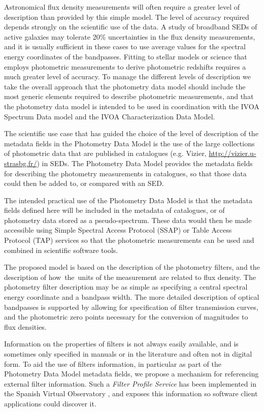 \documentclass[11pt,a4paper]{ivoa}
\begin{document}
Astronomical flux density measurements will often require a
greater level of description than provided by this simple model.
The level of accuracy required depends strongly on the scientific
use of the data. A study of broadband SEDs of active galaxies may
tolerate 20$\%$  uncertainties in the flux density measurements,
and it is usually sufficient in these cases to use average values
for the spectral energy coordinates of the bandpasses. Fitting to
stellar models or science that employs photometric measurements to
derive photometric redshifts requires a much greater level of accuracy.
To manage the different levels of description we take the overall
approach that the photometry data model should include the most
generic elements required to describe photometric measurements,
and that the photometry data model is intended to be used in
coordination with the IVOA Spectrum Data model and the IVOA
Characterization Data Model.

The scientific use case that has guided the choice of the level
of description of the metadata fields in the Photometry Data Model
is the use of the large collections of photometric data that are
published in catalogues (e.g. Vizier, \url{http://vizier.u-strasbg.fr/})
in SEDs. The Photometry Data Model provides the metadata fields for
describing the photometry measurements in catalogues, so that those
data could then be added to, or compared with an SED.

The intended practical use of the Photometry Data Model is that the
metadata fields defined here will be included in the metadata of
catalogues, or of photometry data stored as a pseudo-spectrum. These
data would then be made accessible using Simple Spectral Access Protocol
(SSAP) or Table Access Protocol (TAP) services so that the photometric
measurements can be used and combined in scientific software tools.

The proposed model is based on the description of the photometry
filters, and the description of how\ the\ units of the measurement
are related to flux density. The photometry filter description may
be as simple as specifying a central spectral energy coordinate and
a bandpass width. The more detailed description of optical bandpasses
is supported by allowing for specification of filter transmission
curves, and the   photometric zero points necessary for the conversion
of magnitudes to flux densities.

Information on the properties of filters is not always easily available,
and is sometimes only specified in manuals or in the literature and often
not in digital form. To aid the use of filters information, in particular
as part of the Photometry Data Model metadata fields, we propose a
mechanism for referencing external filter information. Such a
\textit{Filter Profile Service} has been implemented in the Spanish Virtual Observatory
\citep{2012ivoa.rept.1015R}, \citep{2020sea..confE.182R} and exposes this information so software
client applications could discover it.
\end{document}
